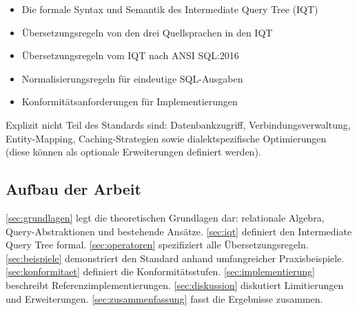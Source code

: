 \begin{itemize}[leftmargin=1.5cm]
  \item Die formale Syntax und Semantik des Intermediate Query Tree (IQT)
  \item Übersetzungsregeln von den drei Quellsprachen in den IQT
  \item Übersetzungsregeln vom IQT nach ANSI SQL:2016
  \item Normalisierungsregeln für eindeutige SQL-Ausgaben
  \item Konformitätsanforderungen für Implementierungen
\end{itemize}

Explizit nicht Teil des Standards sind: Datenbankzugriff, Verbindungsverwaltung,
Entity-Mapping, Caching-Strategien sowie dialektspezifische Optimierungen
(diese können als optionale Erweiterungen definiert werden).

\subsection{Aufbau der Arbeit}
\label{subsec:aufbau}

\ref{sec:grundlagen} legt die theoretischen Grundlagen dar:
relationale Algebra, Query-Abstraktionen und bestehende Ansätze.
\ref{sec:iqt} definiert den Intermediate Query Tree formal.
\ref{sec:operatoren} spezifiziert alle Übersetzungsregeln.
\ref{sec:beispiele} demonstriert den Standard anhand umfangreicher
Praxisbeispiele.
\ref{sec:konformitaet} definiert die Konformitätsstufen.
\ref{sec:implementierung} beschreibt Referenzimplementierungen.
\ref{sec:diskussion} diskutiert Limitierungen und Erweiterungen.
\ref{sec:zusammenfassung} fasst die Ergebnisse zusammen.

